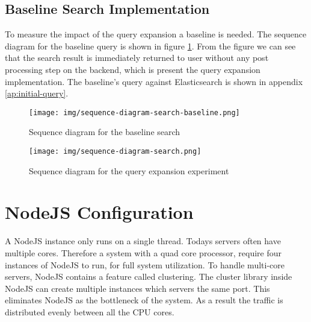 \subsection{Baseline Search Implementation}
To measure the impact of the query expansion a baseline is needed.
The sequence diagram for the baseline query is shown in figure \ref{fig:sequence-diagram-search-baseline}.
From the figure we can see that the search result is immediately returned to user without any post processing step on the backend,
which is present the query expansion implementation.
The baseline's query against Elasticsearch is shown in appendix \ref{ap:initial-query}.

\begin{figure}[h!]
\centering \texttt{[image: img/sequence-diagram-search-baseline.png]}
\caption{Sequence diagram for the baseline search}
\label{fig:sequence-diagram-search-baseline}
\end{figure}

\begin{figure}[h!]
\centering \texttt{[image: img/sequence-diagram-search.png]}
\caption{Sequence diagram for the query expansion experiment}
\label{fig:sequence-diagram-search}
\end{figure}

\section{NodeJS Configuration}
A NodeJS instance only runs on a single thread.
Todays servers often have multiple cores.
Therefore a system with a quad core processor, require four instances of NodeJS to run, for full system utilization.
To handle multi-core servers, NodeJS contains a feature called clustering.
The cluster library inside NodeJS can create multiple instances which servers the same port.
This eliminates NodeJS as the bottleneck of the system.
As a result the traffic is distributed evenly between all the CPU cores.
